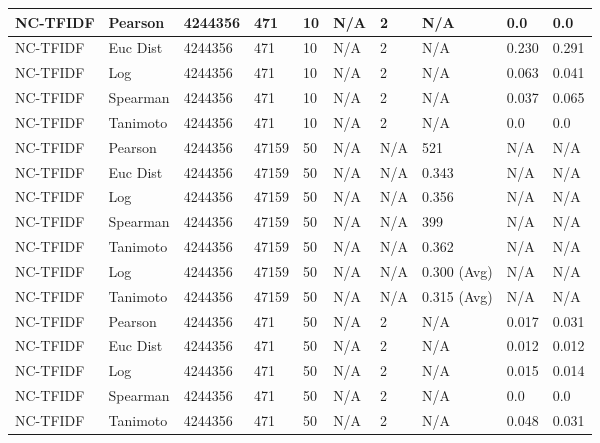 \documentclass{article}
\begin{document}
\begin{longtable}{ |p{1.7cm}|p{1.9cm}|p{1.5cm}|p{1.5cm}|p{0.75cm}|p{0.75cm}|p{0.75cm}|p{0.75cm}|p{1.5cm}|p{1.5cm}|}
    NC-TFIDF  & Pearson & 4244356 & 471 & 10 & N/A  & 2 & N/A & 0.0 & 0.0  \\ \hline
    NC-TFIDF  & Euc Dist & 4244356 & 471 & 10 & N/A  & 2 & N/A & 0.230 & 0.291   \\ \hline
    NC-TFIDF  & Log & 4244356 & 471& 10 & N/A & 2 & N/A & 0.063 & 0.041  \\ \hline
    NC-TFIDF  & Spearman & 4244356 & 471 & 10 & N/A  & 2 & N/A &0.037 & 0.065 \\ \hline
    NC-TFIDF  & Tanimoto & 4244356 & 471 & 10 & N/A  & 2 & N/A & 0.0 & 0.0 \\ \hline
    
    NC-TFIDF & Pearson & 4244356 & 47159 & 50 & N/A & N/A & 521 & N/A & N/A  \\ \hline
    NC-TFIDF  & Euc Dist & 4244356 & 47159 & 50 & N/A & N/A & 0.343 & N/A & N/A   \\ \hline
    NC-TFIDF  & Log & 4244356 & 47159 &  50 & N/A & N/A & 0.356 & N/A & N/A  \\ \hline
    NC-TFIDF  & Spearman & 4244356 & 47159 & 50 & N/A & N/A & 399 & N/A & N/A \\ \hline
    NC-TFIDF  & Tanimoto & 4244356 & 47159 & 50 & N/A& N/A & 0.362 & N/A & N/A \\ \hline
    NC-TFIDF  & Log & 4244356 & 47159 & 50 & N/A& N/A & 0.300 (Avg) & N/A & N/A \\ \hline
    NC-TFIDF  & Tanimoto & 4244356 & 47159 & 50 & N/A & N/A & 0.315 (Avg) & N/A & N/A \\ \hline
    
    NC-TFIDF  & Pearson & 4244356 & 471 & 50 & N/A  & 2 & N/A & 0.017 & 0.031  \\ \hline
    NC-TFIDF  & Euc Dist & 4244356 & 471 & 50 & N/A  & 2 & N/A &0.012 & 0.012   \\ \hline
    NC-TFIDF  & Log & 4244356 & 471 & 50 & N/A & 2 & N/A & 0.015 & 0.014  \\ \hline
    NC-TFIDF  & Spearman & 4244356 & 471& 50 & N/A  & 2 & N/A &0.0 & 0.0 \\ \hline
    NC-TFIDF  & Tanimoto & 4244356 & 471 & 50 & N/A  & 2 & N/A & 0.048 & 0.031 \\ \hline
   

\end{longtable}
\end{document}
